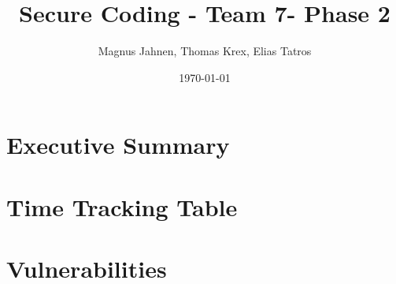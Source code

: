 \documentclass{report}
\title{Secure Coding - Team 7- Phase 2}
\author{Magnus Jahnen, Thomas Krex, Elias Tatros}
\date{\today}
\begin{document}
\maketitle

\part{Executive Summary}

\tableofcontents

\part{Time Tracking Table}

\part{Vulnerabilities}



\end{document}

